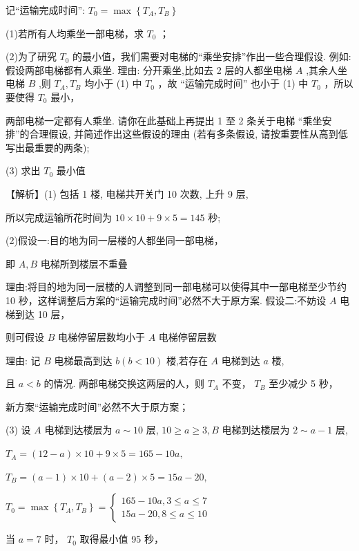 \documentclass[10pt]{article}
\begin{document}
记“运输完成时间”: \({T}_{0} = \max \left\{  {{T}_{A},{T}_{B}}\right\}\)

(1)若所有人均乘坐一部电梯，求 \({T}_{0}\) ；

(2)为了研究 \({T}_{0}\) 的最小值，我们需要对电梯的“乘坐安排”作出一些合理假设. 例如:假设两部电梯都有人乘坐. 理由: 分开乘坐,比如去 2 层的人都坐电梯 \(A\) ,其余人坐电梯 \(B\) ,则 \({T}_{A},{T}_{B}\) 均小于 (1) 中 \({T}_{0}\) ，故 “运输完成时间” 也小于 (1) 中 \({T}_{0}\) ，所以要使得 \({T}_{0}\) 最小，

两部电梯一定都有人乘坐. 请你在此基础上再提出 1 至 2 条关于电梯 “乘坐安排”的合理假设, 并简述作出这些假设的理由 (若有多条假设, 请按重要性从高到低写出最重要的两条);

(3) 求出 \({T}_{0}\) 最小值

【解析】(1) 包括 1 楼, 电梯共开关门 10 次数, 上升 9 层,

所以完成运输所花时间为 \({10} \times  {10} + 9 \times  5 = {145}\) 秒;

(2)假设一:目的地为同一层楼的人都坐同一部电梯，

即 \(A,B\) 电梯所到楼层不重叠

理由:将目的地为同一层楼的人调整到同一部电梯可以使得其中一部电梯至少节约 10 秒，这样调整后方案的“运输完成时间”必然不大于原方案. 假设二:不妨设 \(A\) 电梯到达 10 层，

则可假设 \(B\) 电梯停留层数均小于 \(A\) 电梯停留层数

理由: 记 \(B\) 电梯最高到达 \(b\left( {b < {10}}\right)\) 楼,若存在 \(A\) 电梯到达 \(a\) 楼,

且 \(a < b\) 的情况. 两部电梯交换这两层的人，则 \({T}_{A}\) 不变， \({T}_{B}\) 至少减少 5 秒，

新方案“运输完成时间”必然不大于原方案；

(3) 设 \(A\) 电梯到达楼层为 \(a \sim  {10}\) 层, \({10} \geq  a \geq  3,B\) 电梯到达楼层为 \(2 \sim  a - 1\) 层,

\({T}_{A} = \left( {{12} - a}\right)  \times  {10} + 9 \times  5 = {165} - {10a},\)

\({T}_{B} = \left( {a - 1}\right)  \times  {10} + \left( {a - 2}\right)  \times  5 = {15a} - {20},\)

\({T}_{0} = \max \left\{  {{T}_{A},{T}_{B}}\right\}   = \left\{  \begin{array}{l} {165} - {10a},3 \leq  a \leq  7 \\  {15a} - {20},8 \leq  a \leq  {10} \end{array}\right.\)

当 \(a = 7\) 时， \({T}_{0}\) 取得最小值 95 秒，
\end{document}

